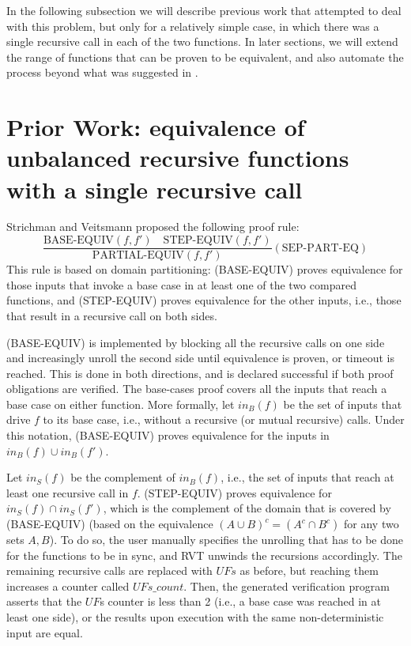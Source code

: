 In the following subsection we will describe previous work\cite{DBLP:conf/fm/StrichmanV16} that attempted to deal with this problem, but only for a relatively simple case, in which there was a single recursive call in each of the two functions. In later sections, we will extend the range of functions that can be proven to be equivalent, and also automate the process beyond what was suggested in \cite{DBLP:conf/fm/StrichmanV16}.

\section{Prior Work: equivalence of unbalanced recursive functions with a single recursive call}
\label{sec:prev}
Strichman and Veitsmann \cite{DBLP:conf/fm/StrichmanV16} proposed the following  proof rule:
\begin{equation}\label{eq:sep-part-eq}
 {\frac {\text{BASE-EQUIV}(f,f') \quad\text{STEP-EQUIV}(f,f')}{\text{PARTIAL-EQUIV}(f,f')}} 
  (\text{SEP-PART-EQ})
\end{equation}
This rule is based on domain partitioning: (BASE-EQUIV) proves equivalence for those inputs that invoke a base case in at least one of the two compared functions, and (STEP-EQUIV) proves equivalence for the other inputs, i.e., those that result in a recursive call on both sides.

(BASE-EQUIV) is implemented by blocking all the recursive calls on one side and increasingly unroll the second side until equivalence is proven, or timeout is reached. This is done in both directions, and is declared successful if both proof obligations are verified. The base-cases proof covers all the inputs that reach a base case on either function. More formally, let $in_B(f)$ be the set of inputs that drive $f$ to its base case, i.e., without a recursive (or mutual recursive) calls. Under this notation, (BASE-EQUIV) proves equivalence for the  inputs in $in_B(f) \cup in_B(f')$.

Let $in_S(f)$ be the complement of $in_B(f)$, i.e., the set of inputs that reach at least one recursive call in $f$.  (STEP-EQUIV) proves equivalence for $in_S(f) \cap in_S(f')$, which is the complement of the domain that is covered by (BASE-EQUIV) (based on the equivalence $(A \cup B)^c = (A^c \cap B^c)$ for any two sets $A,B$). To do so, the user manually specifies the unrolling that has to be done for the functions to be in sync, and RVT unwinds the recursions accordingly. The remaining recursive calls are replaced with $UFs$ as before, but reaching them increases a counter called $UFs\_count$. Then, the generated verification program asserts that the $UF$s counter is less than 2  (i.e., a base case was reached in at least one side), or the results upon execution with the same non-deterministic input are equal. 

